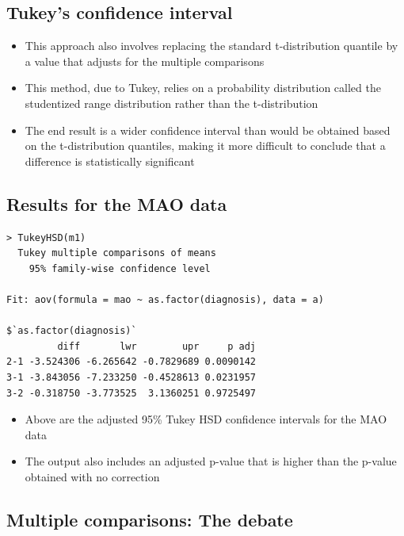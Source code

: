 \documentclass[
]{book}
\providecommand{\tightlist}{%
  \setlength{\itemsep}{0pt}\setlength{\parskip}{0pt}}
\begin{document}
\hypertarget{tukeys-confidence-interval}{%
\subsection{Tukey's confidence interval}\label{tukeys-confidence-interval}}

\begin{itemize}
\tightlist
\item
  This approach also involves replacing the standard t-distribution quantile by a value that adjusts for the multiple comparisons
\item
  This method, due to Tukey, relies on a probability distribution called the studentized range distribution rather than the t-distribution
\item
  The end result is a wider confidence interval than would be obtained based on the t-distribution quantiles, making it more difficult to conclude that a difference is statistically significant
\end{itemize}

\hypertarget{results-for-the-mao-data}{%
\subsection{Results for the MAO data}\label{results-for-the-mao-data}}

\begin{verbatim}
> TukeyHSD(m1)
  Tukey multiple comparisons of means
    95% family-wise confidence level

Fit: aov(formula = mao ~ as.factor(diagnosis), data = a)

$`as.factor(diagnosis)`
         diff       lwr        upr     p adj
2-1 -3.524306 -6.265642 -0.7829689 0.0090142
3-1 -3.843056 -7.233250 -0.4528613 0.0231957
3-2 -0.318750 -3.773525  3.1360251 0.9725497
\end{verbatim}

\begin{itemize}
\tightlist
\item
  Above are the adjusted 95\% Tukey HSD confidence intervals for the MAO data
\item
  The output also includes an adjusted p-value that is higher than the p-value obtained with no correction
\end{itemize}

\hypertarget{multiple-comparisons-the-debate}{%
\subsection{Multiple comparisons: The debate}\label{multiple-comparisons-the-debate}}
\end{document}
